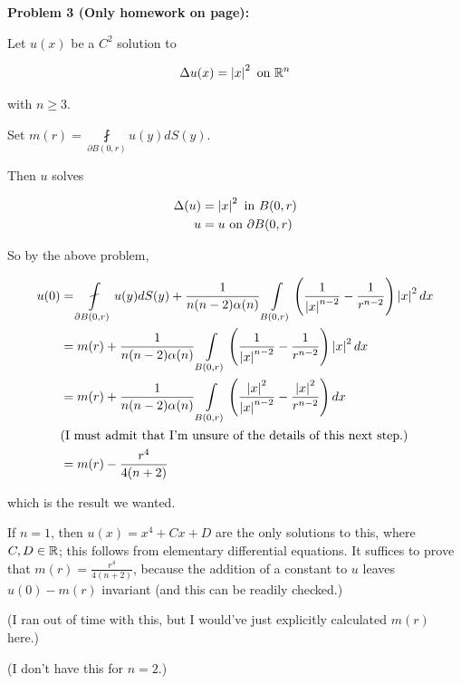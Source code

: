 \documentclass[a4paper,12pt]{article}
\begin{document}
\shunt

{\bf Problem 3 (Only homework on page):}

Let $u(x)$ be a $C^2$ solution to 

\begin{align*}
\Delta u(x) = \left\lvert x \right\rvert^2 \text{ on } \mathbb{R}^n
\end{align*}

with $n \geq 3$.

Set $m(r) = \fint\limits_{\partial B(0,r)} u(y) dS(y)$.

Then $u$ solves 

\begin{align*}
\Delta(u) &= \left\lvert x \right\rvert^2 \text{ in } B(0,r)\\
u &= u \text { on } \partial B(0,r)\\
\end{align*}

So by the above problem,

\begin{align*}
u(0) &= \fint \limits_{\partial B(0,r)} u(y) dS(y) + \frac{1}{n(n-2)\al(n)}\int\limits_{B(0,r)} \left( \frac{1}{\absval{x}^{n-2}} - \frac{1}{r^{n-2}}\right) \absval{x}^2 dx \\
&= m(r) + \frac{1}{n(n-2)\al(n)}\int\limits_{B(0,r)} \left( \frac{1}{\absval{x}^{n-2}} - \frac{1}{r^{n-2}}\right) \absval{x}^2 dx \\
&= m(r) + \frac{1}{n(n-2)\al(n)}\int\limits_{B(0,r)} \left( \frac{\absval{x}^2}{\absval{x}^{n-2}} - \frac{\absval{x}^2}{r^{n-2}}\right) dx \\
& \text{(I must admit that I'm unsure of the details of this next step.)}\\
&= m(r) -\frac{r^4}{4(n+2)} \\ %
\end{align*}

which is the result we wanted.

If $n =1$, then $u(x) = x^4 + Cx + D$ are the only solutions to this, where $C, D \in \mathbb{R}$; this follows from elementary differential equations. It suffices to prove that $m(r) = \frac{r^4}{4(n+2)}$, because the addition of a constant to $u$ leaves $u(0)-m(r)$ invariant (and this can be readily checked.)

(I ran out of time with this, but I would've just explicitly calculated $m(r)$ here.)

(I don't have this for $n=2$.)

\shunt
\end{document}
